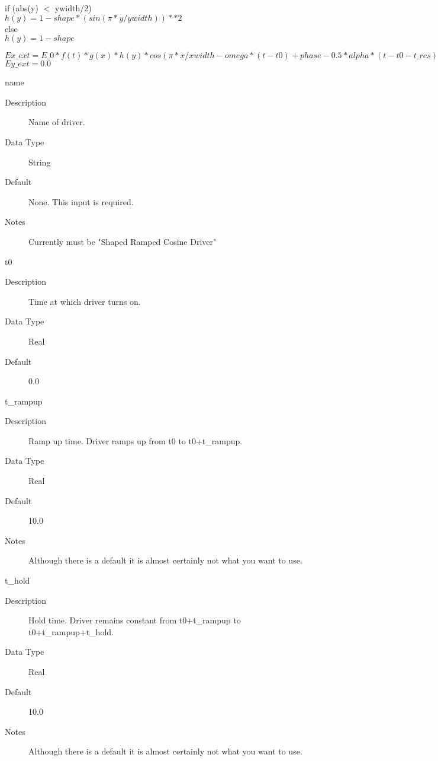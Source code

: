 \documentclass[11pt]{amsart}
\begin{document}
\noindent if (abs(y) $<$ ywidth/2) \\
\indent \begin{math}h(y) = 1-shape*(sin(\pi*y/ywidth))**2\end{math} \\
else \\
\indent \begin{math}h(y) = 1-shape\end{math}

\noindent \begin{math}Ex\_ext = E\_0*f(t)*g(x)*h(y)*
         cos(\pi*x/xwidth-omega*(t-t0)+phase-0.5*alpha*(t-t0-t\_res)**2)\end{math} \\
\begin{math}Ey\_ext = 0.0\end{math}

name
\begin{description}
\item [Description] Name of driver.
\item [Data Type] String
\item [Default] None.  This input is required.
\item [Notes] Currently must be "Shaped Ramped Cosine Driver"
\end{description}

t0
\begin{description}
\item [Description] Time at which driver turns on.
\item [Data Type] Real
\item [Default] 0.0
\end{description}

t\_rampup
\begin{description}
\item [Description] Ramp up time.  Driver ramps up from t0 to t0+t\_rampup.
\item [Data Type] Real
\item [Default] 10.0
\item [Notes] Although there is a default it is almost certainly not what you
want to use.
\end{description}

t\_hold
\begin{description}
\item [Description] Hold time.  Driver remains constant from t0+t\_rampup to \\
t0+t\_rampup+t\_hold.
\item [Data Type] Real
\item [Default] 10.0
\item [Notes] Although there is a default it is almost certainly not what you
want to use.
\end{description}
\end{document}
